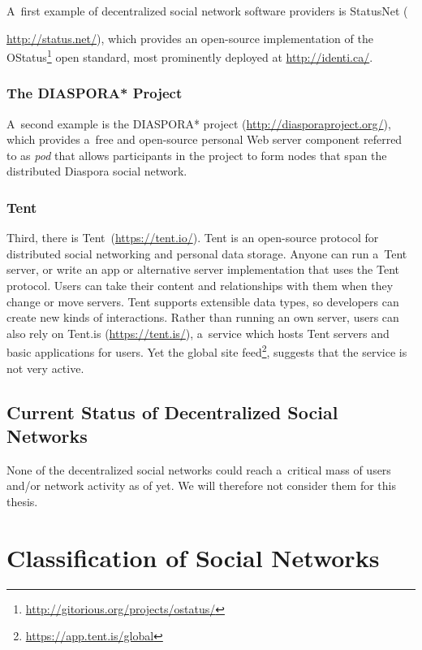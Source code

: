 A~first example of decentralized social network software providers
is StatusNet ({\url{http://status.net/}),
which provides an open-source implementation of the
OStatus\footnote{\url{http://gitorious.org/projects/ostatus/}}
open standard, most prominently deployed
at \url{http://identi.ca/}.

\subsubsection{The DIASPORA* Project}

A~second example is the DIASPORA* project (\url{http://diasporaproject.org/}),
which provides a~free and open-source personal Web server component
referred to as \emph{pod} that allows
participants in the project to form nodes
that span the distributed Diaspora social network.

\subsubsection{Tent}

Third, there is Tent\texttrademark~(\url{https://tent.io/}).
Tent is an open-source protocol for distributed social networking
and personal data storage.
Anyone can run a~Tent server,
or write an app or alternative server implementation
that uses the Tent protocol.
Users can take their content and relationships with them
when they change or move servers.
Tent supports extensible data types,
so developers can create new kinds of interactions.
Rather than running an own server,
users can also rely on Tent.is (\url{https://tent.is/}),
a~service which hosts Tent servers
and basic applications for users.
Yet the global site feed\footnote{\url{https://app.tent.is/global}},
suggests that the service is not very active.

\subsection{Current Status of Decentralized Social Networks}

None of the decentralized social networks could reach
a~critical mass of users and/or network activity as of yet.
We will therefore not consider them for this thesis.

\section{Classification of Social Networks}
\label{sec:classification-of-social-networks}

}
